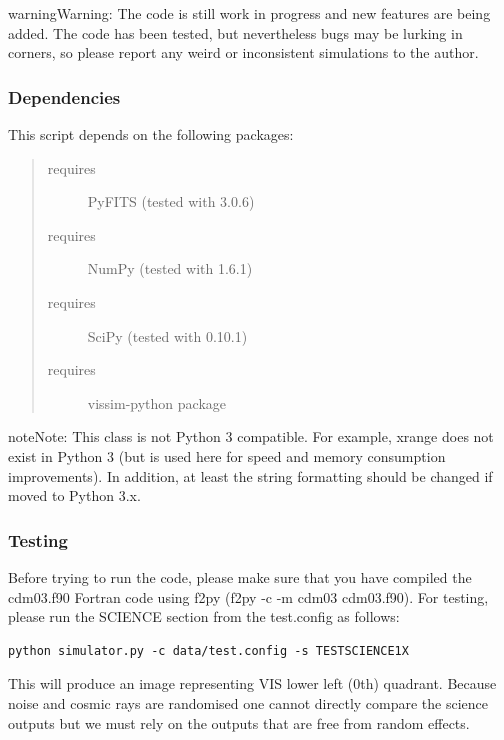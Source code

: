\documentclass[a4paper,12pt,english]{sphinxmanual}
\begin{document}
\begin{notice}{warning}{Warning:}
The code is still work in progress and new features are being added.
The code has been tested, but nevertheless bugs may be lurking in corners, so
please report any weird or inconsistent simulations to the author.
\end{notice}


\subsubsection{Dependencies}
\label{simulator:dependencies}
This script depends on the following packages:
\begin{quote}\begin{description}
\item[{requires}] \leavevmode
PyFITS (tested with 3.0.6)

\item[{requires}] \leavevmode
NumPy (tested with 1.6.1)

\item[{requires}] \leavevmode
SciPy (tested with 0.10.1)

\item[{requires}] \leavevmode
vissim-python package

\end{description}\end{quote}

\begin{notice}{note}{Note:}
This class is not Python 3 compatible. For example, xrange does not exist
in Python 3 (but is used here for speed and memory consumption improvements).
In addition, at least the string formatting should be changed if moved to
Python 3.x.
\end{notice}


\subsubsection{Testing}
\label{simulator:testing}
Before trying to run the code, please make sure that you have compiled the
cdm03.f90 Fortran code using f2py (f2py -c -m cdm03 cdm03.f90). For testing,
please run the SCIENCE section from the test.config as follows:

\begin{Verbatim}[commandchars=\\\{\}]
python simulator.py -c data/test.config -s TESTSCIENCE1X
\end{Verbatim}

This will produce an image representing VIS lower left (0th) quadrant. Because
noise and cosmic rays are randomised one cannot directly compare the science
outputs but we must rely on the outputs that are free from random effects.
\end{document}

